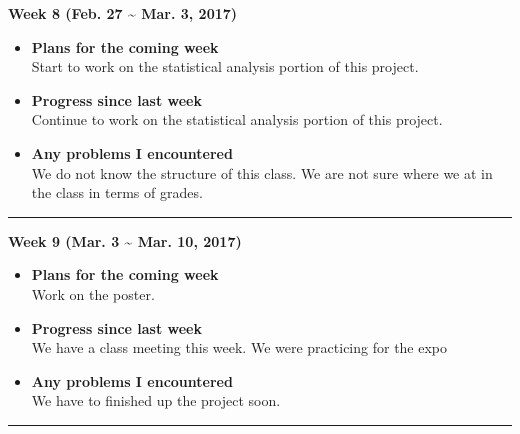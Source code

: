 	\begin{center}
		\textbf{Week 8 (Feb. 27 {\textasciitilde{}} Mar. 3, 2017)}
	\end{center}
	\begin{itemize}
		\item \textbf{Plans for the coming week}
		\\Start to work on the statistical analysis portion of this project. \\

		\item \textbf{Progress since last week}
		\\Continue to work on the statistical analysis portion of this project. \\

		\item \textbf{Any problems I encountered}
		\\We do not know the structure of this class. We are not sure where we at in the class in terms of grades.\\
	\end{itemize}

	\rule{\textwidth}{0.5pt}

	\begin{center}
		\textbf{Week 9 (Mar. 3 {\textasciitilde{}} Mar. 10, 2017)}
	\end{center}
	\begin{itemize}
		\item \textbf{Plans for the coming week}
		\\Work on the poster. \\

		\item \textbf{Progress since last week}
		\\We have a class meeting this week. We were practicing for the expo \\

		\item \textbf{Any problems I encountered}
		\\We have to finished up the project soon.\\
	\end{itemize}

	\rule{\textwidth}{0.5pt}

